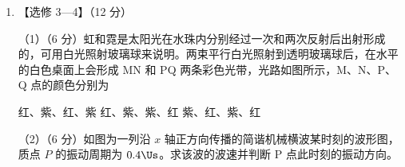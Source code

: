 \documentclass[\gkver]{gaokaozhenti}
\begin{document}
\begin{enumerate}
（2）（6 分）北方某地的冬天室外气温很低，吹出的肥皂泡会很快冻结。若刚吹出时肥皂泡内气体温度为 $T_{1}$，压强为 $p_{1}$，肥皂泡冻结后泡内气体温度降为 $T_{2}$。整个过程中泡内气体视为理想气体，不计体积和质量变化，大气压为 $p_{0}$。求冻结后肥皂膜内外气体的压强差。


\item
【选修 3—4】（12 分）

（1）（6 分）虹和霓是太阳光在水珠内分别经过一次和两次反射后出射形成的，可用白光照射玻璃球来说明。两束平行白光照射到透明玻璃球后，在水平的白色桌面上会形成 MN 和 PQ 两条彩色光带，光路如图所示，M、N、P、Q 点的颜色分别为


{红、紫、红、紫}
{红、紫、紫、红}
{紫、红、紫、红}

（2）（6 分）如图为一列沿 $x$ 轴正方向传播的简谐机械横波某时刻的波形图，质点 $P$ 的振动周期为 $0.4\Us$。求该波的波速并判断 P 点此时刻的振动方向。



\end{enumerate}
\end{document}
